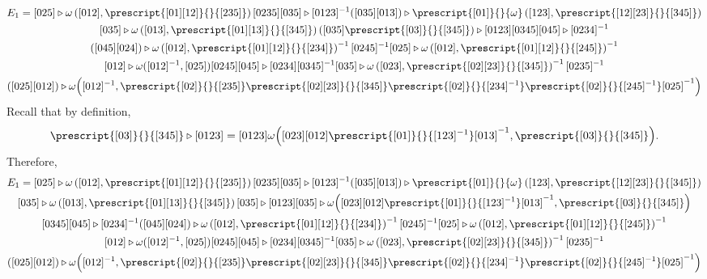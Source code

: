 \documentclass[a4paper, oneside]{amsart}
\numberwithin{equation}{subsection}
\theoremstyle{referencedlemma}
\theoremstyle{plain} %
\theoremstyle{remark}
\begin{document}
\begin{multline*}
E_1 = [025]\triangleright \omega\left([012], \prescript{[01][12]}{}{[235]} \right) [0235] [035]\triangleright [0123]^{-1} ([035][013]) \triangleright \prescript{[01]}{}{\omega} \left([123], \prescript{[12][23]}{}{[345]} \right)\\
[035]\triangleright \omega\left([013], \prescript{[01][13]}{}{[345]} \right)([035]\prescript{[03]}{}{[345]}) \triangleright [0123] [0345][045]\triangleright [0234]^{-1} \\
([045][024]) \triangleright \omega \left( [012], \prescript{[01][12]}{}{[234]} \right)^{-1} [0245]^{-1}[025]\triangleright \omega\left([012], \prescript{[01][12]}{}{[245]} \right)^{-1} \\
 [012] \triangleright \omega ([012]^{-1}, [025]) [0245][045]\triangleright [0234][0345]^{-1}  [035] \triangleright \omega\left([023], \prescript{[02][23]}{}{[345]} \right)^{-1} [0235]^{-1} \\
([025][012])\triangleright \omega \Big ([012]^{-1}, \prescript{[02]}{}{[235]} \prescript{[02][23]}{}{[345]}\prescript{[02]}{}{[234]^{-1}} \prescript{[02]}{}{[245]^{-1}} [025]^{-1} \Big )
\end{multline*}
Recall that by definition,
\begin{equation*}
\prescript{[03]}{}{[345]}\triangleright [0123] = [0123] \omega\Big ( [023][012]\prescript{[01]}{}{[123]^{-1}}[013]^{-1}, \prescript{[03]}{}{[345]}  \Big ).
\end{equation*}
Therefore,
\begin{multline*}
E_1 = [025]\triangleright \omega\left([012], \prescript{[01][12]}{}{[235]} \right) [0235] [035]\triangleright [0123]^{-1} ([035][013]) \triangleright \prescript{[01]}{}{\omega} \left([123], \prescript{[12][23]}{}{[345]} \right)\\
[035]\triangleright \omega\left([013], \prescript{[01][13]}{}{[345]} \right)[035]\triangleright [0123] [035]\triangleright \omega\Big ( [023][012]\prescript{[01]}{}{[123]^{-1}}[013]^{-1}, \prescript{[03]}{}{[345]}  \Big )\\
  [0345][045]\triangleright [0234]^{-1} ([045][024]) \triangleright \omega \left( [012], \prescript{[01][12]}{}{[234]} \right)^{-1} [0245]^{-1}[025]\triangleright \omega\left([012], \prescript{[01][12]}{}{[245]} \right)^{-1} \\
 [012] \triangleright \omega ([012]^{-1}, [025]) [0245][045]\triangleright [0234][0345]^{-1}  [035] \triangleright \omega\left([023], \prescript{[02][23]}{}{[345]} \right)^{-1} [0235]^{-1} \\
([025][012])\triangleright \omega \Big ([012]^{-1}, \prescript{[02]}{}{[235]} \prescript{[02][23]}{}{[345]}\prescript{[02]}{}{[234]^{-1}} \prescript{[02]}{}{[245]^{-1}} [025]^{-1} \Big )
\end{multline*}
\end{document}
